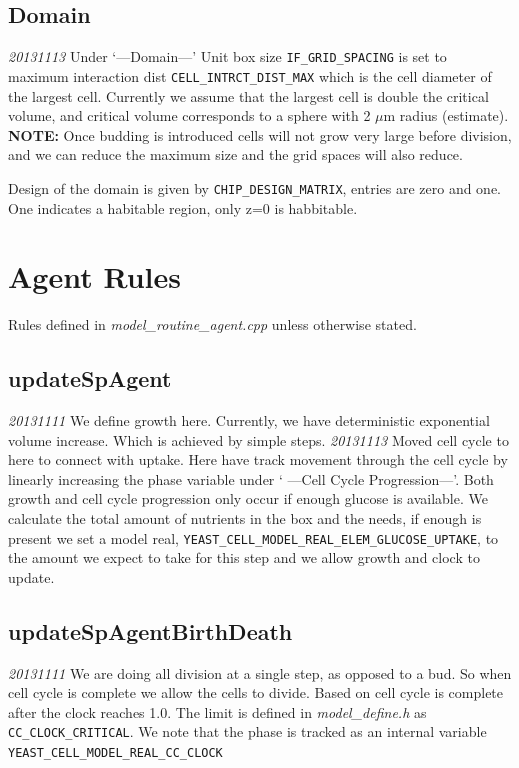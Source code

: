 \documentclass{article}
\begin{document}
\subsection{Domain}
\emph{20131113} Under `---Domain---'
Unit box size \texttt{IF\_GRID\_SPACING} is set to maximum interaction dist 
\texttt{CELL\_INTRCT\_DIST\_MAX} which is the cell diameter of the largest cell.
Currently we assume that the largest cell is double the critical volume,
and critical volume corresponds to a sphere with 2 $\mu$m radius (estimate).
\textbf{NOTE:} Once budding is introduced cells will not grow very large before division,
and we can reduce the maximum size and the grid spaces will also reduce.

Design of the domain is given by \texttt{CHIP\_DESIGN\_MATRIX}, 
entries are zero and one.
One indicates a habitable region, only z=0 is habbitable.





\section{Agent Rules}
Rules defined in \textit{model\_routine\_agent.cpp} unless otherwise stated.

\subsection{updateSpAgent}
\emph{20131111} We define growth here.  
Currently, we have deterministic exponential volume increase.
Which is achieved by simple steps.  
\emph{20131113} Moved cell cycle to here to connect with uptake.
Here have track movement through the cell cycle by linearly increasing the phase variable under ` ---Cell Cycle Progression---'.
Both growth and cell cycle progression only occur if enough glucose is available.
We calculate the total amount of nutrients in the box and the needs,
if enough is present we set a model real, \texttt{YEAST\_CELL\_MODEL\_REAL\_ELEM\_GLUCOSE\_UPTAKE},
to the amount we expect to take for this step and we allow growth and clock to update.



\subsection{updateSpAgentBirthDeath }
\emph{20131111} We are doing all division at a single step,
as opposed to a bud.
So when cell cycle is complete we allow the cells to divide.
Based on \cite{Charvin2009} cell cycle is complete after the clock reaches 1.0.
The limit is defined in \textit{model\_define.h} as \texttt{CC\_CLOCK\_CRITICAL}.
We note that the phase is tracked as an internal variable \texttt{YEAST\_CELL\_MODEL\_REAL\_CC\_CLOCK}
\end{document}

